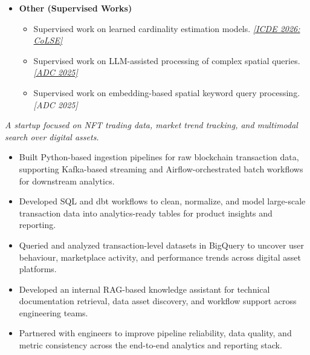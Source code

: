 \documentclass{resume}
\begin{document}
\begin{itemize}[parsep=0.4ex]
\begin{itemize}[parsep=0.3ex]
\item Developed recursive learned spatial index structures and studied their effectiveness for spatial query workloads.
\href{https://github.com/Liuguanli/RSMI}{\faGithub}
\href{https://www.vldb.org/pvldb/vol13/p2341-qi.pdf}{\textit{[VLDB 2020\faExternalLink]}}
\end{itemize}

\item \textbf{Other (Supervised Works)}
\begin{itemize}[parsep=0.3ex]
    \item Supervised work on learned cardinality estimation models. 
    \href{<paper-link>}{\textit{[ICDE 2026: CoLSE\faExternalLink]}}

   

    \item Supervised work on LLM-assisted processing of complex spatial queries. 
    \href{https://github.com/AI-DB-UoM/complex_spatial_data_generation}{\faGithub}
    \href{https://findanexpert.unimelb.edu.au/scholarlywork/2270718-llm-enhanced-processing-of-complex-spatial-queries?cache=1772143387383}{\textit{[ADC 2025\faExternalLink]}}

     \item Supervised work on embedding-based spatial keyword query processing.{\textit{[ADC 2025]}}
\end{itemize}

\end{itemize}

\textit{A startup focused on NFT trading data, market trend tracking, and multimodal search over digital assets.}

\begin{itemize}[parsep=0.4ex]

\item Built Python-based ingestion pipelines for raw blockchain transaction data, supporting Kafka-based streaming and Airflow-orchestrated batch workflows for downstream analytics.

\item Developed SQL and dbt workflows to clean, normalize, and model large-scale transaction data into analytics-ready tables for product insights and reporting.

\item Queried and analyzed transaction-level datasets in BigQuery to uncover user behaviour, marketplace activity, and performance trends across digital asset platforms.

\item Developed an internal RAG-based knowledge assistant for technical documentation retrieval, data asset discovery, and workflow support across engineering teams.

\item Partnered with engineers to improve pipeline reliability, data quality, and metric consistency across the end-to-end analytics and reporting stack.

\end{itemize}
\end{document}
